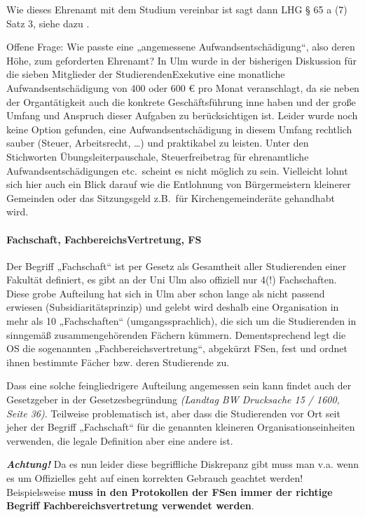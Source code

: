 \documentclass[
10pt,
a4paper,
twoside,								%
titlepage=false,							%
draft=false								%
]{scrartcl}
\begin{document}
Wie dieses Ehrenamt mit dem Studium vereinbar ist sagt dann LHG § 65 a (7) Satz 3, siehe dazu .

Offene Frage: Wie passte eine „angemessene Aufwandsentschädigung“, also deren Höhe, zum geforderten Ehrenamt? In Ulm wurde in der bisherigen Diskussion für die sieben Mitglieder der StudierendenExekutive eine monatliche Aufwandsentschädigung von 400 oder 600 € pro Monat veranschlagt, da sie neben der Organtätigkeit auch die konkrete Geschäftsführung inne haben und der große Umfang und Anspruch dieser Aufgaben zu berücksichtigen ist. Leider wurde noch keine Option gefunden, eine Aufwandsentschädigung in diesem Umfang rechtlich sauber (Steuer, Arbeitsrecht, …) und praktikabel zu leisten. Unter den Stichworten Übungsleiterpauschale, Steuerfreibetrag für ehrenamtliche Aufwandsentschädigungen etc.~scheint es nicht möglich zu sein. Vielleicht lohnt sich hier auch ein Blick darauf wie die Entlohnung von Bürgermeistern kleinerer Gemeinden oder das Sitzungsgeld z.B.~für Kirchengemeinderäte gehandhabt wird.



\paragraph{Fachschaft, FachbereichsVertretung, FS}\label{Glossar: Fachschaft, Fachbereichsvertretung, FS}

Der Begriff „Fachschaft“ ist per Gesetz als Gesamtheit aller Studierenden einer Fakultät definiert, es gibt an der Uni Ulm also offiziell nur 4(!) Fachschaften.
Diese grobe Aufteilung hat sich in Ulm aber schon lange als nicht passend erwiesen (Subsidiaritätsprinzip) und gelebt wird deshalb eine Organisation in mehr als 10 „Fachschaften“ (umgangssprachlich), die sich um die Studierenden in sinngemäß zusammengehörenden Fächern kümmern.
Dementsprechend legt die OS die sogenannten „Fachbereichsvertretung“, abgekürzt FSen, fest und ordnet ihnen bestimmte Fächer bzw. deren Studierende zu.

Dass eine solche feingliedrigere Aufteilung angemessen sein kann findet auch der Gesetzgeber in der Gesetzesbegründung \textit{(Landtag BW Drucksache 15 / 1600, Seite 36)}.
Teilweise problematisch ist, aber dass die Studierenden vor Ort seit jeher der Begriff „Fachschaft“ für die genannten kleineren Organisationseinheiten verwenden, die legale Definition aber eine andere ist.

\textbf{\emph{Achtung!}} Da es nun leider diese begriffliche Diskrepanz gibt muss man v.a. wenn es um Offizielles geht auf einen korrekten Gebrauch geachtet werden! Beispielsweise \textbf{muss in den Protokollen der FSen immer der richtige Begriff Fachbereichsvertretung verwendet werden}.
\end{document}
